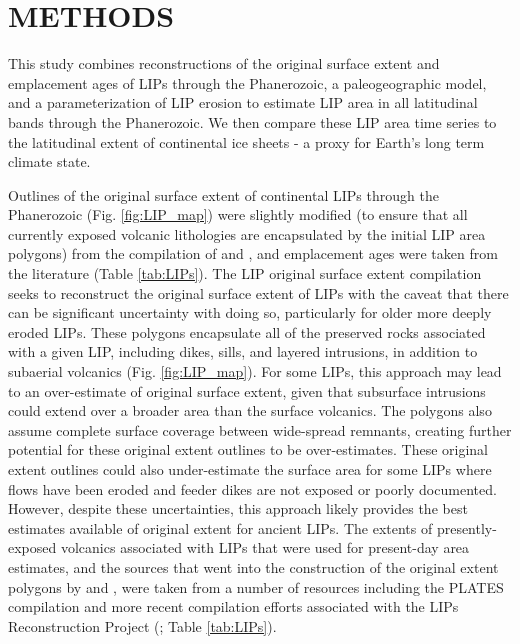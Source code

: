 \documentclass[11pt,letterpaper]{article}
\begin{document}
\section*{METHODS}

This study combines reconstructions of the original surface extent and emplacement ages of LIPs through the Phanerozoic, a paleogeographic model, and a parameterization of LIP erosion to estimate LIP area in all latitudinal bands through the Phanerozoic. We then compare these LIP area time series to the latitudinal extent of continental ice sheets - a proxy for Earth's long term climate state.

Outlines of the original surface extent of continental LIPs through the Phanerozoic (Fig. \ref{fig:LIP_map}) were slightly modified (to ensure that all currently exposed volcanic lithologies are encapsulated by the initial LIP area polygons) from the compilation of \citet{Ernst2017a} and \citet{Ernst2019a}, and emplacement ages were taken from the literature (Table \ref{tab:LIPs}). The LIP original surface extent compilation seeks to reconstruct the original surface extent of LIPs with the caveat that there can be significant uncertainty with doing so, particularly for older more deeply eroded LIPs. These polygons encapsulate all of the preserved rocks associated with a given LIP, including dikes, sills, and layered intrusions, in addition to subaerial volcanics (Fig. \ref{fig:LIP_map}). For some LIPs, this approach may lead to an over-estimate of original surface extent, given that subsurface intrusions could extend over a broader area than the surface volcanics. The polygons also assume complete surface coverage between wide-spread remnants, creating further potential for these original extent outlines to be over-estimates. These original extent outlines could also under-estimate the surface area for some LIPs where flows have been eroded and feeder dikes are not exposed or poorly documented. However, despite these uncertainties, this approach likely provides the best estimates available of original extent for ancient LIPs. The extents of presently-exposed volcanics associated with LIPs that were used for present-day area estimates, and the sources that went into the construction of the original extent polygons by \citet{Ernst2017a} and \citet{Ernst2019a}, were taken from a number of resources including the PLATES compilation \citep{Coffin2006a} and more recent compilation efforts associated with the LIPs Reconstruction Project (\citealp{Ernst2013a}; Table \ref{tab:LIPs}).
\end{document}
